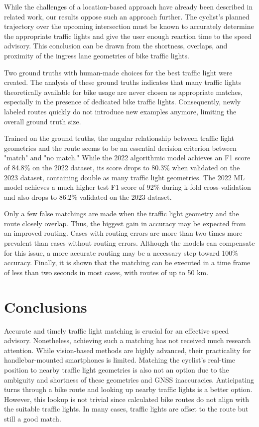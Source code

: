 \begin{Summary}
While the challenges of a location-based approach have already been described in related work, our results oppose such an approach further. The cyclist's planned trajectory over the upcoming intersection must be known to accurately determine the appropriate traffic lights and give the user enough reaction time to the speed advisory. This conclusion can be drawn from the shortness, overlaps, and proximity of the ingress lane geometries of bike traffic lights. 

Two ground truths with human-made choices for the best traffic light were created. The analysis of these ground truths indicates that many traffic lights theoretically available for bike usage are never chosen as appropriate matches, especially in the presence of dedicated bike traffic lights. Consequently, newly labeled routes quickly do not introduce new examples anymore, limiting the overall ground truth size. 

Trained on the ground truths, the angular relationship between traffic light geometries and the route seems to be an essential decision criterion between "match" and "no match." While the 2022 algorithmic model achieves an F1 score of 84.8\% on the 2022 dataset, its score drops to 80.3\% when validated on the 2023 dataset, containing double as many traffic light geometries. The 2022 ML model achieves a much higher test F1 score of 92\% during k-fold cross-validation and also drops to 86.2\% validated on the 2023 dataset. 

Only a few false matchings are made when the traffic light geometry and the route closely overlap. Thus, the biggest gain in accuracy may be expected from an improved routing. Cases with routing errors are more than two times more prevalent than cases without routing errors. Although the models can compensate for this issue, a more accurate routing may be a necessary step toward 100\% accuracy. Finally, it is shown that the matching can be executed in a time frame of less than two seconds in most cases, with routes of up to 50 km. 
\end{Summary}

\section{Conclusions}

Accurate and timely traffic light matching is crucial for an effective speed advisory. Nonetheless, achieving such a matching has not received much research attention. While vision-based methods are highly advanced, their practicality for handlebar-mounted smartphones is limited. Matching the cyclist's real-time position to nearby traffic light geometries is also not an option due to the ambiguity and shortness of these geometries and GNSS inaccuracies. Anticipating turns through a bike route and looking up nearby traffic lights is a better option. However, this lookup is not trivial since calculated bike routes do not align with the suitable traffic lights. In many cases, traffic lights are offset to the route but still a good match.

